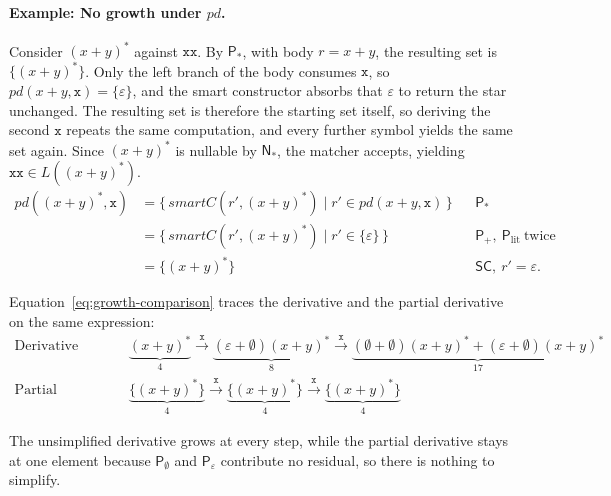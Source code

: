 %

\paragraph{Example: No growth under $pd$.}
Consider $(x+y)^{*}$ against $\mathtt{xx}$.
By $\mathsf{P}_{*}$, with body $r=x+y$, 
the resulting set is $\{(x+y)^{*}\}$. 
Only the left branch of the body consumes $\mathtt{x}$, 
so $pd(x+y,\mathtt{x}) = \{\varepsilon\}$, 
and the smart constructor absorbs that $\varepsilon$ to return the star unchanged. 
The resulting set is therefore the starting set itself, 
so deriving the second $\mathtt{x}$ repeats the same computation, 
and every further symbol yields the same set again. 
Since $(x+y)^{*}$ is nullable by $\mathsf{N}_{*}$, 
the matcher accepts, yielding $\mathtt{xx}\in L((x+y)^{*})$.
\begin{equation}\label{eq:der-15}
\begin{aligned}
pd((x+y)^{*},\mathtt{x})
  &= \{\, \mathit{smartC}(r',(x+y)^{*}) \mid r' \in pd(x+y,\mathtt{x}) \,\}
  &&\mathsf{P}_{*} \\
  &= \{\, \mathit{smartC}(r',(x+y)^{*}) \mid r' \in \{\varepsilon\} \,\}
  &&\mathsf{P}_{+},\ \mathsf{P}_{\mathrm{lit}}\ \text{twice} \\
  &= \{(x+y)^{*}\}
  &&\mathsf{SC},\ r' = \varepsilon.
\end{aligned}
\end{equation}

Equation~\eqref{eq:growth-comparison} traces the derivative 
and the partial derivative on the same expression:
\begin{equation}\label{eq:growth-comparison}
\begin{aligned}
\text{Derivative (unsimplified):} &\quad
  \underbrace{(x{+}y)^{*}}_{4}
  \xrightarrow{\mathtt{x}}
  \underbrace{(\varepsilon{+}\emptyset)(x{+}y)^{*}}_{8}
  \xrightarrow{\mathtt{x}}
  \underbrace{(\emptyset{+}\emptyset)(x{+}y)^{*}{+}(\varepsilon{+}\emptyset)(x{+}y)^{*}}_{17} \\[6pt]
\text{Partial derivative:} &\quad
  \underbrace{\{(x{+}y)^{*}\}}_{4}
  \xrightarrow{\mathtt{x}}
  \underbrace{\{(x{+}y)^{*}\}}_{4}
  \xrightarrow{\mathtt{x}}
  \underbrace{\{(x{+}y)^{*}\}}_{4}
\end{aligned}
\end{equation}

The unsimplified derivative grows at every step, 
while the partial derivative stays at one element 
because $\mathsf{P}_{\emptyset}$ and $\mathsf{P}_{\varepsilon}$ 
contribute no residual, 
so there is nothing to simplify.

